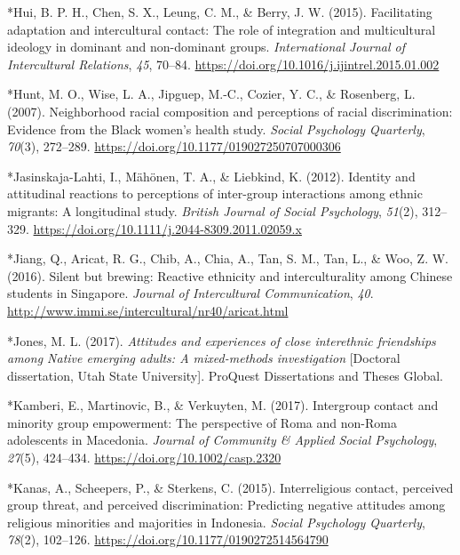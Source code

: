 \documentclass[12pt, letterpaper]{article}
\begin{document}
\leavevmode\hypertarget{ref-609}{}%
*Hui, B. P. H., Chen, S. X., Leung, C. M., \& Berry, J. W. (2015).
Facilitating adaptation and intercultural contact: The role of
integration and multicultural ideology in dominant and non-dominant
groups. \emph{International Journal of Intercultural Relations},
\emph{45}, 70--84. \url{https://doi.org/10.1016/j.ijintrel.2015.01.002}

\leavevmode\hypertarget{ref-2001}{}%
*Hunt, M. O., Wise, L. A., Jipguep, M.-C., Cozier, Y. C., \& Rosenberg,
L. (2007). Neighborhood racial composition and perceptions of racial
discrimination: Evidence from the Black women's health study.
\emph{Social Psychology Quarterly}, \emph{70}(3), 272--289.
\url{https://doi.org/10.1177/019027250707000306}

\leavevmode\hypertarget{ref-2341}{}%
*Jasinskaja-Lahti, I., Mähönen, T. A., \& Liebkind, K. (2012). Identity
and attitudinal reactions to perceptions of inter-group interactions
among ethnic migrants: A longitudinal study. \emph{British Journal of
Social Psychology}, \emph{51}(2), 312--329.
\url{https://doi.org/10.1111/j.2044-8309.2011.02059.x}

\leavevmode\hypertarget{ref-19}{}%
*Jiang, Q., Aricat, R. G., Chib, A., Chia, A., Tan, S. M., Tan, L., \&
Woo, Z. W. (2016). Silent but brewing: Reactive ethnicity and
interculturality among Chinese students in Singapore. \emph{Journal of
Intercultural Communication}, \emph{40}.
\url{http://www.immi.se/intercultural/nr40/aricat.html}

\leavevmode\hypertarget{ref-303}{}%
*Jones, M. L. (2017). \emph{Attitudes and experiences of close
interethnic friendships among Native emerging adults: A mixed-methods
investigation} {[}Doctoral dissertation, Utah State University{]}.
ProQuest Dissertations and Theses Global.

\leavevmode\hypertarget{ref-856}{}%
*Kamberi, E., Martinovic, B., \& Verkuyten, M. (2017). Intergroup
contact and minority group empowerment: The perspective of Roma and
non-Roma adolescents in Macedonia. \emph{Journal of Community \& Applied
Social Psychology}, \emph{27}(5), 424--434.
\url{https://doi.org/10.1002/casp.2320}

\leavevmode\hypertarget{ref-1411}{}%
*Kanas, A., Scheepers, P., \& Sterkens, C. (2015). Interreligious
contact, perceived group threat, and perceived discrimination:
Predicting negative attitudes among religious minorities and majorities
in Indonesia. \emph{Social Psychology Quarterly}, \emph{78}(2),
102--126. \url{https://doi.org/10.1177/0190272514564790}
\end{document}

